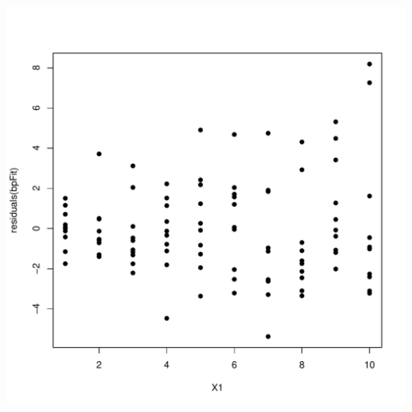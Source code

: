 \documentclass[xcolor=dvipsnames]{beamer}\usepackage{graphicx, color}
\makeatletter
\def\maxwidth{ %
  \ifdim\Gin@nat@width>\linewidth
    \linewidth
  \else
    \Gin@nat@width
  \fi
}
\newenvironment{knitrout}{}{} %
\makeatother
\begin{document}
\begin{frame}[fragile]
\begin{knitrout}
\color{fgcolor}
\includegraphics[width=\maxwidth]{figure/BrueschPaganPlot} 

\end{knitrout}

\end{frame}
\end{document}
